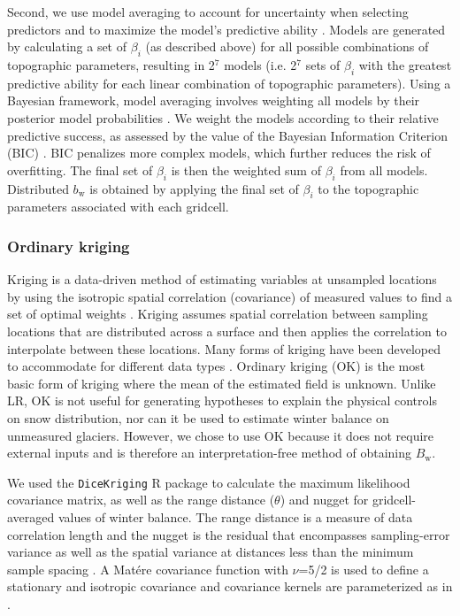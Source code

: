 \documentclass[twocolumn, letterpaper]{igs}
\begin{document}
Second, we use model averaging to account for uncertainty when selecting predictors and to maximize the model's predictive ability \citep{Madigan1994}. Models are generated by calculating a set of $\beta_i$ (as described above) for all possible combinations of topographic parameters, resulting in 2$^7$ models (i.e. 2$^7$ sets of $\beta_i$ with the greatest predictive ability for each linear combination of topographic parameters). Using a Bayesian framework, model averaging involves weighting all models by their posterior model probabilities \citep{Raftery1997}. We weight the models according to their relative predictive success, as assessed by the value of the Bayesian Information Criterion (BIC) \citep{Burnham2004}. BIC penalizes more complex models, which further reduces the risk of overfitting. The final set of $\beta_i$ is then the weighted sum of $\beta_i$ from all models. Distributed $b_\mathrm{w}$ is obtained by applying the final set of $\beta_i$ to the topographic parameters associated with each gridcell. 

\subsubsection{Ordinary kriging}

Kriging is a data-driven method of estimating variables at unsampled locations by using the isotropic spatial correlation (covariance) of measured values to find a set of optimal weights \citep{Davis1986, Li2008}. Kriging assumes spatial correlation between sampling locations that are distributed across a surface and then applies the correlation to interpolate between these locations. Many forms of kriging have been developed to accommodate for different data types \citep[e.g.][and sources within]{Li2008}. Ordinary kriging (OK) is the most basic form of kriging where the mean of the estimated field is unknown. Unlike LR, OK is not useful for generating hypotheses to explain the physical controls on snow distribution, nor can it be used to estimate winter balance on unmeasured glaciers. However, we chose to use OK because it does not require external inputs and is therefore an interpretation-free method of obtaining $B_\mathrm{w}$.

We used the \texttt{DiceKriging} R package \citep{Roustant2012} to calculate the maximum likelihood covariance matrix, as well as the range distance ($\theta$) and nugget for gridcell-averaged values of winter balance. The range distance is a measure of data correlation length and the nugget is the residual that encompasses sampling-error variance as well as the spatial variance at distances less than the minimum sample spacing \citep{Li2008}. A Mat\'ere covariance function with $\nu$=5/2 is used to define a stationary and isotropic covariance and covariance kernels are parameterized as in \cite{Rasmussen2006}. 
\end{document}

